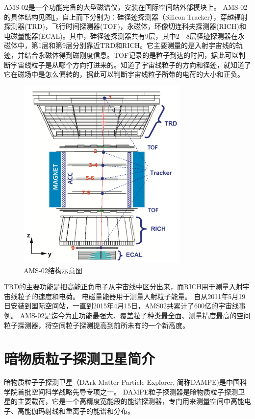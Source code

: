 AMS-02是一个功能完备的大型磁谱仪，安装在国际空间站外部模块上。
AMS-02的具体结构见图\ref{fig:introduction:ams02}，自上而下分别为：硅径迹探测器（Silicon Tracker），穿越辐射探测器(TRD)，飞行时间探测器(TOF)，永磁体，环像切连科夫探测器(RICH)和电磁量能器(ECAL)。其中，硅径迹探测器共有9层，其中2—8层径迹探测器在永磁体中，第1层和第9层分别靠近TRD和RICH。它主要测量的是入射宇宙线的轨迹，并结合永磁体得到磁刚度信息。TOF记录的是粒子到达的时间，据此可以判断宇宙线粒子是从哪个方向打进来的。知道了宇宙线粒子的方向和径迹，就知道了它在磁场中是怎么偏转的，据此可以判断宇宙线粒子所带的电荷的大小和正负。
\begin{figure}[htbp]
	\centering
	\includegraphics[width=0.75\textwidth]{chap/introduction/fig/ams022.png}
	\caption{AMS-02结构示意图}
	\label{fig:introduction:ams02}
\end{figure}
TRD的主要功能是把高能正负电子从宇宙线中区分出来，而RICH用于测量入射宇宙线粒子的速度和电荷。
电磁量能器用于测量入射粒子能量。
自从2011年5月19日安装到国际空间站，一直到2015年4月15日，AMS02共累计了600亿的宇宙线事例。
AMS-02是迄今为止功能最强大、覆盖粒子种类最全面、测量精度最高的空间粒子探测器，将空间粒子探测提高到前所未有的一个新高度。


\section{暗物质粒子探测卫星简介}
暗物质粒子子探测卫星（DArk Matter Particle Explorer, 简称DAMPE)是中国科学院首批空间科学战略先导专项之一。
DAMPE粒子探测器是暗物质粒子探测卫星的主要载荷，它是一个高精度宽能段的能谱探测器，专门用来测量空间中高能电子、高能伽玛射线和重离子的能谱和分布。

